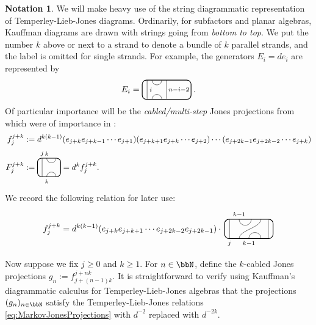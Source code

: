 \documentclass[11pt]{article}
\theoremstyle{plain}
\theoremstyle{definition}
\newtheorem{nota}[thm]{Notation}
\begin{document}
\begin{nota}
\label{nota:TLJK Diagrams}
We will make heavy use of the string diagrammatic representation of Temperley-Lieb-Jones diagrams.
Ordinarily, for subfactors and planar algebras, Kauffman diagrams \cite{MR899057} are drawn with strings going from \emph{bottom to top}. 
We put the number $k$ above or next to a strand to denote a bundle of $k$ parallel strands, and the label is omitted for single strands.
For example, the generators $E_i = de_i$ are represented by
$$
E_i
=
\begin{tikzpicture}[baseline = .3cm]
 \draw[thick, rounded corners = 5pt] (0,0) rectangle (2,.8);
 \draw (.2,0) -- (.2,.8);
 \draw (1,0) -- (1,.8);
 \draw (.4,.8) arc (-180:0:.2cm);
 \draw (.4,0) arc (180:0:.2cm);
 \node at (.35,.4) {\scriptsize{$i$}};
 \node at (1.5,.4) {\scriptsize{$n{-}i{-}2$}};
\end{tikzpicture}\,.
$$
Of particular importance will be the \emph{cabled/multi-step} Jones projections from \cite{MR965748} which were of importance in \cite{MR1424954,MR2812459}:
\begin{align*}
f^{j+k}_j
&:=
d^{k(k-1)}(e_{j+k}e_{j+k-1}\cdots e_{j+1})(e_{j+k+1}e_{j+k}\cdots e_{j+2})\cdots(e_{j+2k-1}e_{j+2k-2}\cdots e_{j+k})
\\
F^{j+k}_j
&:=
\begin{tikzpicture}[baseline = .3cm]
 \draw[thick, rounded corners = 5pt] (0,0) rectangle (1,.8);
 \draw (.2,0) -- (.2,.8);
 \draw (.4,.8) arc (-180:0:.2cm);
 \draw (.4,0) arc (180:0:.2cm);
 \node at (.4,1) {\scriptsize{$k$}};
 \node at (.4,-.2) {\scriptsize{$k$}};
 \node at (.2,1) {\scriptsize{$j$}};
\end{tikzpicture}
=
d^k f^{j+k}_j.
\end{align*}
We record the following relation for later use:
\begin{equation}
\label{eq:MultistepRelation}
f^{j+k}_j
=
d^{k(k-1)}(e_{j+k}e_{j+k+1}\cdots e_{j+2k-2}e_{j+2k-1})
\cdot\,
\begin{tikzpicture}[baseline = .3cm]
 \draw[thick, rounded corners = 5pt] (0,0) rectangle (2,.8);
 \draw (.2,0) -- (.2,.8);
 \draw (1.8,0) -- (1.8,.8);
 \draw (.6,.8) arc (-180:0:.25cm);
 \draw (.6,0)  .. controls ++(90:.35cm) and ++(270:.35cm) .. (1.5,.8);
 \draw (1,0) arc (180:0:.25cm);
 \node at (.6,1) {\scriptsize{$k{-}1$}};
 \node at (1,-.2) {\scriptsize{$k{-}1$}};
 \node at (.2,-.2) {\scriptsize{$j$}};
\end{tikzpicture}
\end{equation}

Now suppose we fix $j\geq 0$ and $k\geq 1$.
For $n\in \bbN$, define the $k$-cabled Jones projections
$
g_n := f^{j+nk}_{j+(n-1)k}
$.
It is straightforward to verify using Kauffman's diagrammatic calculus for Temperley-Lieb-Jones algebras that the projections $(g_n)_{n\in \bbN}$ satisfy the Temperley-Lieb-Jones relations \ref{eq:MarkovJonesProjections} with $d^{-2}$ replaced with $d^{-2k}$.
\end{nota}
\end{document}
